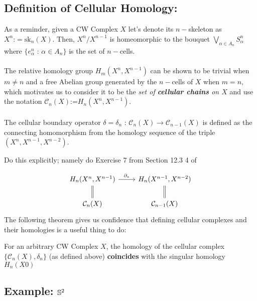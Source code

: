 \documentclass[11pt]{article}
\begin{document}
\subsection{Definition of Cellular Homology:}
As a reminder, given a CW Complex $X$ let's denote its $n-$skeleton as $X^n \text{:}= \mathrm{sk}_n(X)$. Then, $X^n / X^{n-1}$ is homeomorphic to the bouquet $\bigvee_{\alpha \in A_n} S_{\alpha}^n $ where $\{e^n_{\alpha} \text{ : } \alpha \in A_{n}\}$ is the set of $n-$cells. 
\\
\\
The relative homology group $H_m(X^n, X^{n-1})$ can be shown to be trivial when $m \neq n$ and a free Abelian group generated by the $n-$cells of $X$ when $m = n$, which motivates us to consider it to be the \emph{set of \textbf{cellular chains} on $X$} and use the notation $\mathcal{C}_n(X) \text{:=} H_n(X^n, X^{n-1})$.
\\
\\
The cellular boundary operator $\delta = \delta_n \text{ : } \mathcal{C}_n(X) \rightarrow \mathcal{C}_{n-1}(X)$ is defined as the connecting homomorphism from the homology sequence of the triple $(X^n, X^{n-1}, X^{n-2})$. \begin{note}
  {Do this explicitly; namely do Exercise 7 from Section 12.3 4 of \cite{FomenkoFuchs16}}
\end{note} \[\begin{tikzcd}
	{H_n(X^n, X^{n-1})} & {H_n(X^{n-1}, X^{n-2})} \\
	{\mathcal{C}_n(X)} & {\mathcal{C}_{n-1}(X)}
	\arrow["{\partial_{*}}", from=1-1, to=1-2]
	\arrow[Rightarrow, no head, from=1-1, to=2-1]
	\arrow[Rightarrow, no head, from=1-2, to=2-2]
\end{tikzcd}\] The following theorem gives us confidence that defining cellular complexes and their homologies is a useful thing to do:

\begin{theorem}
  For an arbitrary CW Complex $X$, the homology of the cellular complex $\{\mathcal{C}_n(X), \delta_n\}$ (as defined above) \textbf{coincides} with the singular homology $H_n(X0)$
\end{theorem}

\subsection{Example: $\mathbb{S}^2$}



\newpage
\end{document}
